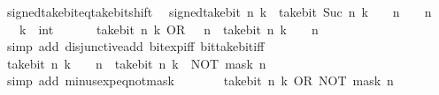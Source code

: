 \begin{isabellebody}
\isamarkupfalse%
%
\endisatagproof
{\isafoldproof}%
%
\isadelimproof
\isanewline
%
\endisadelimproof
\isanewline
{}\isamarkupfalse%
\ signed{\isacharunderscore}{\kern0pt}take{\isacharunderscore}{\kern0pt}bit{\isacharunderscore}{\kern0pt}eq{\isacharunderscore}{\kern0pt}take{\isacharunderscore}{\kern0pt}bit{\isacharunderscore}{\kern0pt}shift{\isacharcolon}{\kern0pt}\isanewline
\ \ {\isacartoucheopen}signed{\isacharunderscore}{\kern0pt}take{\isacharunderscore}{\kern0pt}bit\ n\ k\ {\isacharequal}{\kern0pt}\ take{\isacharunderscore}{\kern0pt}bit\ {\isacharparenleft}{\kern0pt}Suc\ n{\isacharparenright}{\kern0pt}\ {\isacharparenleft}{\kern0pt}k\ {\isacharplus}{\kern0pt}\ {}\ {\isacharcircum}{\kern0pt}\ n{\isacharparenright}{\kern0pt}\ {\isacharminus}{\kern0pt}\ {}\ {\isacharcircum}{\kern0pt}\ n{\isacartoucheclose}\isanewline
\ \ \ k\ {\isacharcolon}{\kern0pt}{\isacharcolon}{\kern0pt}\ int\isanewline
%
\isadelimproof
%
\endisadelimproof
%
\isatagproof
{}\isamarkupfalse%
\ {\isacharminus}{\kern0pt}\isanewline
\ \ \isamarkupfalse%
\ {\isacharasterisk}{\kern0pt}{\isacharcolon}{\kern0pt}\ {\isacartoucheopen}take{\isacharunderscore}{\kern0pt}bit\ n\ k\ OR\ {}\ {\isacharcircum}{\kern0pt}\ n\ {\isacharequal}{\kern0pt}\ take{\isacharunderscore}{\kern0pt}bit\ n\ k\ {\isacharplus}{\kern0pt}\ {}\ {\isacharcircum}{\kern0pt}\ n{\isacartoucheclose}\isanewline
\ \ \ \ \isamarkupfalse%
\ {\isacharparenleft}{\kern0pt}simp\ add{\isacharcolon}{\kern0pt}\ disjunctive{\isacharunderscore}{\kern0pt}add\ bit{\isacharunderscore}{\kern0pt}exp{\isacharunderscore}{\kern0pt}iff\ bit{\isacharunderscore}{\kern0pt}take{\isacharunderscore}{\kern0pt}bit{\isacharunderscore}{\kern0pt}iff{\isacharparenright}{\kern0pt}\isanewline
\ \ \isamarkupfalse%
\ {\isacartoucheopen}take{\isacharunderscore}{\kern0pt}bit\ n\ k\ {\isacharminus}{\kern0pt}\ {}\ {\isacharcircum}{\kern0pt}\ n\ {\isacharequal}{\kern0pt}\ take{\isacharunderscore}{\kern0pt}bit\ n\ k\ {\isacharplus}{\kern0pt}\ NOT\ {\isacharparenleft}{\kern0pt}mask\ n{\isacharparenright}{\kern0pt}{\isacartoucheclose}\isanewline
\ \ \ \ \isamarkupfalse%
\ {\isacharparenleft}{\kern0pt}simp\ add{\isacharcolon}{\kern0pt}\ minus{\isacharunderscore}{\kern0pt}exp{\isacharunderscore}{\kern0pt}eq{\isacharunderscore}{\kern0pt}not{\isacharunderscore}{\kern0pt}mask{\isacharparenright}{\kern0pt}\isanewline
\ \ \isamarkupfalse%
\ \isamarkupfalse%
\ {\isacartoucheopen}{\isasymdots}\ {\isacharequal}{\kern0pt}\ take{\isacharunderscore}{\kern0pt}bit\ n\ k\ OR\ NOT\ {\isacharparenleft}{\kern0pt}mask\ n{\isacharparenright}{\kern0pt}{\isacartoucheclose}\isanewline

\end{isabellebody}
